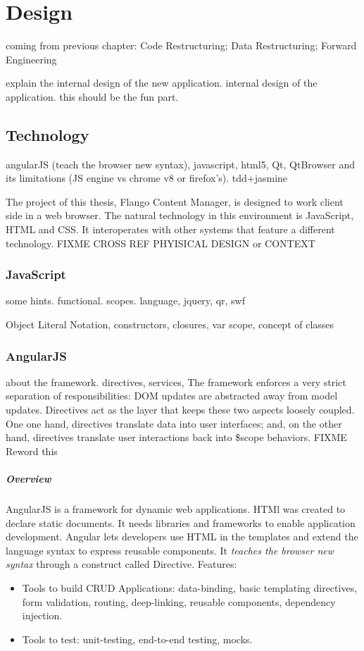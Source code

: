 \chapter{Design}
coming from previous chapter: Code Restructuring; Data Restructuring; Forward Engineering
    
    
explain the internal design of the new application.
internal design of the application. this should be the fun part.
\section{Technology}
angularJS (teach the browser new syntax), javascript, html5, Qt, QtBrowser and its limitations (JS engine vs chrome v8 or firefox's). tdd+jasmine

The project of this thesis, Flango Content Manager, is designed to work client side in a web browser.
The natural technology in this environment is JavaScript, HTML and CSS.
It interoperates with other systems that feature a different technology. FIXME CROSS REF PHYISICAL DESIGN or CONTEXT



\subsection{JavaScript}
some hints. functional. scopes.
language, jquery, qr, swf

Object Literal Notation, constructors, closures, var scope, concept of classes



\subsection{AngularJS}
about the framework. directives, services, 
The framework enforces a very strict separation of responsibilities: DOM updates are abstracted away from model updates. 
Directives act as the layer that keeps these two aspects loosely coupled. One one hand, directives translate data into user interfaces; and, on the other hand, directives translate user interactions back into \$scope behaviors. FIXME Reword this

\paragraph{Overview} AngularJS is a framework for dynamic web applications.
\ac{HTMl} was created to declare static documents. 
It needs libraries and frameworks to enable application development.
Angular lets developers use \ac{HTML} in the templates and extend the language syntax to express reusable components.
It \textit{teaches the browser new syntax} through a construct called Directive.
Features:
\begin{itemize}
    \item Tools to build \ac{CRUD} Applications: data-binding, basic templating directives, form validation, routing, deep-linking, reusable components, dependency injection.
    \item Tools to test: unit-testing, end-to-end testing, mocks.
\end{itemize}

